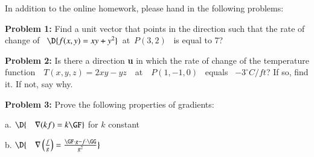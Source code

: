 \documentclass[11pt]{article}
\begin{document}


In addition to the online homework, please hand in the following problems:

\vspace{0.2cm}

{\bf Problem 1:} Find a unit vector that points in the direction such that the rate of change of \, $\D{f(x,y) = xy + y^2}$\, at \,$P(3,2)$ \, is equal to 7?

\vspace{0.1cm}

{\bf Problem 2:} Is there a direction {\bf u} in which the rate of change of the temperature function \,\, $T(x,y,z) = 2xy-yz$ \,\, at \,\, $P(1, -1,0)$ \,  equals \,  $-3^{\circ} C/ft$? If so, find it. If not, say why. 

\vspace{0.1cm}

{\bf Problem 3:} Prove the following properties of gradients:

\quad a. $\D{\quad \nabla(kf) = k\GF }$ \quad for $k$ constant

\vspace{0.1cm}

\quad b. $\D{\quad \nabla\left(\frac{f}{g}\right) = \frac{\GF \cdot g - f \cdot \GG}{g^2}}$
		
\end{document}
